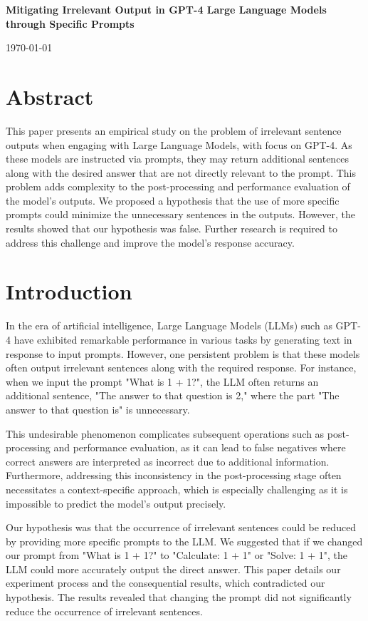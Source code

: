 \documentclass[12pt]{article}
\begin{document}
\begin{titlepage}
	\centering
	\vspace*{8cm}
	{\huge\bfseries Mitigating Irrelevant Output in GPT-4 Large Language Models through Specific Prompts\par}
	\vspace{2cm}
	{\Large\itshape <Your Name>\par}
	\vfill
	{\large \today\par}
\end{titlepage}

\section*{Abstract}

This paper presents an empirical study on the problem of irrelevant sentence outputs when engaging with Large Language Models, with focus on GPT-4. As these models are instructed via prompts, they may return additional sentences along with the desired answer that are not directly relevant to the prompt. This problem adds complexity to the post-processing and performance evaluation of the model's outputs. We proposed a hypothesis that the use of more specific prompts could minimize the unnecessary sentences in the outputs. However, the results showed that our hypothesis was false. Further research is required to address this challenge and improve the model's response accuracy.

\section{Introduction}

In the era of artificial intelligence, Large Language Models (LLMs) such as GPT-4 have exhibited remarkable performance in various tasks by generating text in response to input prompts. However, one persistent problem is that these models often output irrelevant sentences along with the required response. For instance, when we input the prompt "What is 1 + 1?", the LLM often returns an additional sentence, "The answer to that question is 2," where the part "The answer to that question is" is unnecessary.

This undesirable phenomenon complicates subsequent operations such as post-processing and performance evaluation, as it can lead to false negatives where correct answers are interpreted as incorrect due to additional information. Furthermore, addressing this inconsistency in the post-processing stage often necessitates a context-specific approach, which is especially challenging as it is impossible to predict the model's output precisely.

Our hypothesis was that the occurrence of irrelevant sentences could be reduced by providing more specific prompts to the LLM. We suggested that if we changed our prompt from "What is 1 + 1?" to "Calculate: 1 + 1" or "Solve: 1 + 1", the LLM could more accurately output the direct answer. This paper details our experiment process and the consequential results, which contradicted our hypothesis. The results revealed that changing the prompt did not significantly reduce the occurrence of irrelevant sentences. 
\end{document}
